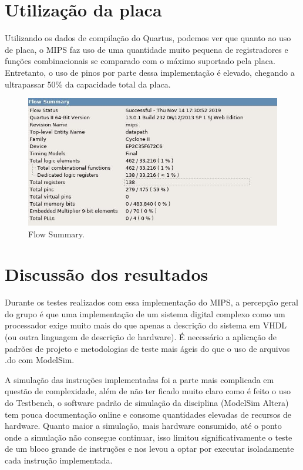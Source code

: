 \documentclass{article}
\begin{document}
    \section{Utilização da placa}

    Utilizando os dados de compilação do Quartus, podemos ver que quanto ao uso
    de placa, o MIPS faz uso de uma quantidade muito pequena de registradores e
    funções combinacionais se comparado com o máximo suportado pela placa.
    Entretanto, o uso de pinos por parte dessa implementação é elevado,
    chegando a ultrapassar 50\% da capacidade total da placa.

    \begin{figure}[H]
        \centering
        \includegraphics[width=\textwidth]{flow_summary.jpg}
        \caption{Flow Summary.}
        \label{figura:mips}
    \end{figure}

    \section{Discussão dos resultados}

    Durante os testes realizados com essa implementação do MIPS, a percepção
    geral do grupo é que uma implementação de um sistema digital complexo como
    um processador exige muito mais do que apenas a descrição do sistema em
    VHDL (ou outra linguagem de descrição de hardware). É necessário a
    aplicação de padrões de projeto e metodologias de teste mais ágeis do que o
    uso de arquivos .do com ModelSim.

    A simulação das instruções implementadas foi a parte mais complicada em
    questão de complexidade, além de não ter ficado muito claro como é feito o
    uso do Testbench, o software padrão de simulação da disciplina (ModelSim
    Altera) tem pouca documentação online e consome quantidades elevadas de
    recursos de hardware. Quanto maior a simulação, mais hardware consumido,
    até o ponto onde a simulação não consegue continuar, isso limitou
    significativamente o teste de um bloco grande de instruções e nos levou a
    optar por executar isoladamente cada instrução implementada.
\end{document}
